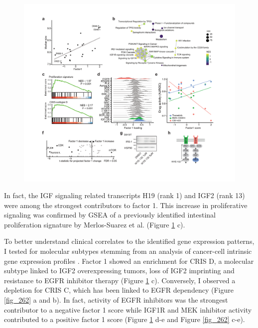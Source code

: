\begin{flushleft}
\begin{figure}[h!]
\centering
\includegraphics[width=\textwidth,
                height=\textheight,
                keepaspectratio]{figures/promise/pdf/fig_6_1.pdf}
\caption{}
\label{fig_261}
\end{figure}
\bigbreak

In fact, the IGF signaling related transcripts H19 (rank 1) and IGF2 (rank 13) were among the strongest contributors to factor 1. This increase in proliferative signaling was confirmed by GSEA of a previously identified intestinal proliferation signature by Merlos-Suarez et al. \cite{Merlos-Suarez2011-gd} (Figure \ref{fig_261} c). 

\bigbreak
To better understand clinical correlates to the identified gene expression patterns, I tested for molecular subtypes stemming from an analysis of cancer-cell intrinsic gene expression profiles \cite{Isella2017-bm}. Factor 1 showed an enrichment for CRIS D, a molecular subtype linked to IGF2 overexpressing tumors, loss of IGF2 imprinting and resistance to EGFR inhibitor therapy (Figure \ref{fig_261} c). Conversely, I observed a depletion for CRIS C, which has been linked to EGFR dependency (Figure \ref{fig_262} a and b). In fact, activity of EGFR inhibitors was the strongest contributor to a negative factor 1 score while IGF1R and MEK inhibitor activity contributed to a positive factor 1 score (Figure \ref{fig_261} d-e and Figure \ref{fig_262} c-e).


\end{flushleft}
